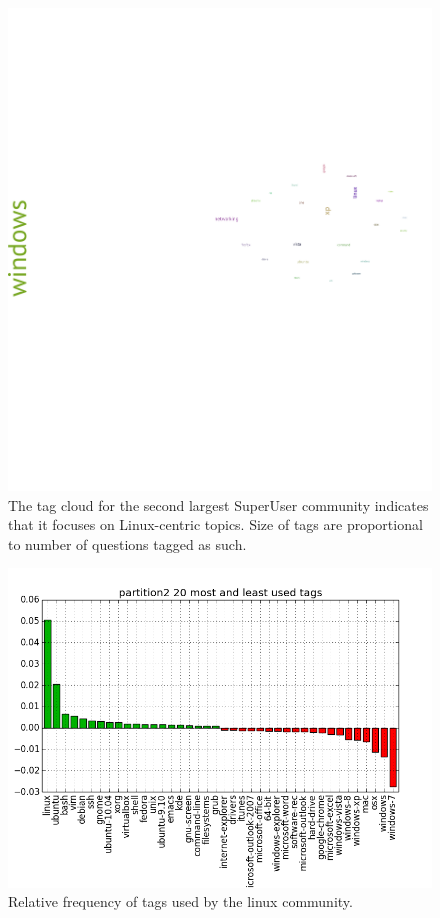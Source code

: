 \documentclass[a4paper]{article}
\begin{document}
\begin{figure}
\centering
\includegraphics[width=\columnwidth]{partition0}
\caption{The tag cloud for the second largest SuperUser community indicates that it focuses on Linux-centric topics. Size of tags are proportional to number of questions tagged as such.}
\label{fig:linux-tags}
\end{figure}

\begin{figure}
\centering
\includegraphics[width=\columnwidth]{partition2-tags}
\caption{Relative frequency of tags used by the linux community.}
\label{fig:linux-tags1}
\end{figure}
\end{document}
